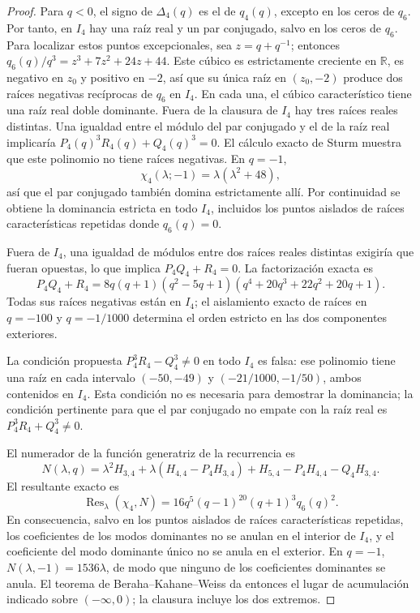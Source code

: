 \documentclass[11pt,a4paper]{article}
\theoremstyle{definition}
\begin{document}
\begin{proof}
Para $q<0$, el signo de $\Delta_4(q)$ es el de $q_4(q)$, excepto en
los ceros de $q_6$. Por tanto, en $I_4$ hay una raíz real y un par
conjugado, salvo en los ceros de $q_6$. Para localizar estos puntos
excepcionales, sea $z=q+q^{-1}$; entonces
$q_6(q)/q^3=z^3+7z^2+24z+44$. Este cúbico es estrictamente creciente
en $\mathbb R$, es negativo en $z_0$ y positivo en $-2$, así que su
única raíz en $(z_0,-2)$ produce dos raíces negativas recíprocas de
$q_6$ en $I_4$. En cada una, el cúbico característico tiene una raíz
real doble dominante. Fuera de la clausura de $I_4$ hay tres raíces
reales distintas. Una igualdad entre el módulo del par conjugado y el de la
raíz real implicaría
$P_4(q)^3R_4(q)+Q_4(q)^3=0$. El cálculo exacto de Sturm muestra que
este polinomio no tiene raíces negativas. En $q=-1$,
\[
\chi_4(\lambda;-1)=\lambda(\lambda^2+48),
\]
así que el par conjugado también domina estrictamente allí. Por
continuidad se obtiene la dominancia estricta en todo $I_4$, incluidos
los puntos aislados de raíces características repetidas donde
$q_6(q)=0$.

Fuera de $I_4$, una igualdad de módulos entre dos raíces reales
distintas exigiría que fueran opuestas, lo que implica
$P_4Q_4+R_4=0$. La factorización exacta es
\[
P_4Q_4+R_4
=8q(q+1)(q^2-5q+1)(q^4+20q^3+22q^2+20q+1).
\]
Todas sus raíces negativas están en $I_4$; el aislamiento exacto de
raíces en $q=-100$ y $q=-1/1000$ determina el orden estricto en las dos
componentes exteriores.

La condición propuesta
$P_4^3R_4-Q_4^3\ne0$ en todo $I_4$ es falsa: ese polinomio tiene una
raíz en cada intervalo $(-50,-49)$ y $(-21/1000,-1/50)$, ambos
contenidos en $I_4$. Esta condición no es necesaria para demostrar la
dominancia; la condición pertinente para que el par conjugado no empate
con la raíz real es $P_4^3R_4+Q_4^3\ne0$.

El numerador de la función generatriz de la recurrencia es
\[
N(\lambda,q)=\lambda^2H_{3,4}
+\lambda(H_{4,4}-P_4H_{3,4})
+H_{5,4}-P_4H_{4,4}-Q_4H_{3,4}.
\]
El resultante exacto es
\[
\operatorname{Res}_\lambda(\chi_4,N)
=16q^5(q-1)^{20}(q+1)^3q_6(q)^2.
\]
En consecuencia, salvo en los puntos aislados de raíces características
repetidas, los coeficientes de los modos dominantes no se anulan en el
interior de $I_4$, y el coeficiente del modo dominante único no se
anula en el exterior. En $q=-1$,
$N(\lambda,-1)=1536\lambda$, de modo que ninguno de los coeficientes
dominantes se anula. El teorema de Beraha--Kahane--Weiss
\cite{BerahaKahaneWeiss1975} da entonces el
lugar de acumulación indicado sobre $(-\infty,0)$; la clausura incluye
los dos extremos.
\end{proof}
\end{document}
